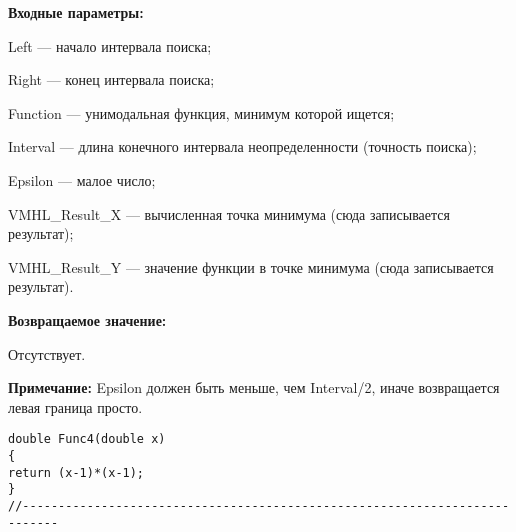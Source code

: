 \textbf{Входные параметры:}

 Left --- начало интервала поиска;
 
Right --- конец интервала поиска;
 
Function --- унимодальная функция, минимум которой ищется;
 
Interval --- длина конечного интервала неопределенности (точность поиска);
 
Epsilon --- малое число;
 
VMHL\_Result\_X --- вычисленная точка минимума (сюда записывается результат);
 
VMHL\_Result\_Y --- значение функции в точке минимума (сюда записывается результат).

\textbf{Возвращаемое значение:}
 
 Отсутствует.
 
\textbf{Примечание:}
 Epsilon должен быть меньше, чем Interval/2, иначе возвращается левая граница просто.

\begin{lstlisting}[caption=Оптимизируемая функция]
double Func4(double x)
{
return (x-1)*(x-1);
}
//---------------------------------------------------------------------------
\end{lstlisting}